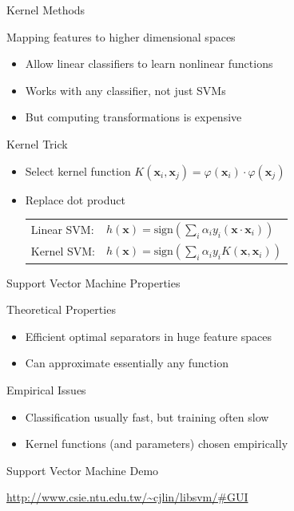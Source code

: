 \documentclass[12pt]{beamer}
\begin{document}
\begin{frame}{Kernel Methods}
	\begin{block}{Mapping features to higher dimensional spaces}
		\begin{itemize}
			\pause
			\item Allow linear classifiers to learn nonlinear functions
			\pause
			\item Works with any classifier, not just SVMs
			\pause
			\item \alert{But computing transformations is expensive}
		\end{itemize}
	\end{block}
	\pause
	\begin{block}{Kernel Trick}
		\begin{itemize}
			\pause
			\item Select kernel function $K(\mathbf{x}_{i}, \mathbf{x}_{j}) = \varphi(\mathbf{x}_{i}) \cdot \varphi(\mathbf{x}_{j})$
			\pause
			\item Replace dot product
				\begin{tabular}{ll}
					Linear SVM:
					& 
					$h(\mathbf{x}) = \mbox{sign}\left(\sum\limits_{i}\alpha_{i}y_{i}(\mathbf{x}\cdot\mathbf{x}_{i})\right)$
					\pause \\
					Kernel SVM:
					&
					$h(\mathbf{x}) = \mbox{sign}\left(\sum\limits_{i}\alpha_{i}y_{i}K(\mathbf{x},\mathbf{x}_{i})\right)$
				\end{tabular}
		\end{itemize}
	\end{block}
\end{frame}
\begin{frame}[<+->]{Support Vector Machine Properties}
	\begin{block}{Theoretical Properties}
		\begin{itemize}
			\item Efficient optimal separators in huge feature spaces
			\item Can approximate essentially any function
		\end{itemize}
	\end{block}
	\begin{block}{Empirical Issues}
		\begin{itemize}
			\item Classification usually fast, but training often slow
			\item Kernel functions (and parameters) chosen empirically
		\end{itemize}
	\end{block}
\end{frame}
\begin{frame}[fragile]{Support Vector Machine Demo}
	\begin{center}
		\small\url{http://www.csie.ntu.edu.tw/~cjlin/libsvm/#GUI}
	\end{center}
\end{frame}
\end{document}
